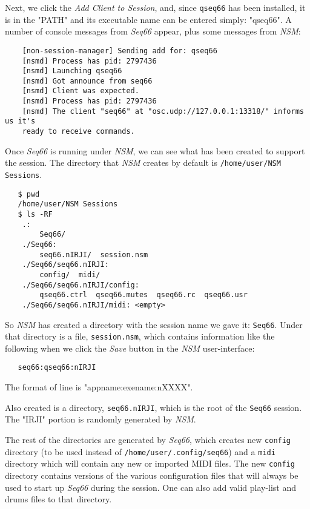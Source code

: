    Next, we click the \textsl{Add Client to Session}, and, since
   \texttt{qseq66} has been installed, it is in the "PATH" and its executable
   name can be entered simply: "qseq66".  A number of console messages from
   \textsl{Seq66} appear, plus some messages from \textsl{NSM}:

\begin{verbatim}
	[non-session-manager] Sending add for: qseq66
	[nsmd] Process has pid: 2797436
	[nsmd] Launching qseq66
	[nsmd] Got announce from seq66
	[nsmd] Client was expected.
	[nsmd] Process has pid: 2797436
	[nsmd] The client "seq66" at "osc.udp://127.0.0.1:13318/" informs us it's
    ready to receive commands.
\end{verbatim}

	Once \textsl{Seq66} is running under \textsl{NSM}, we can see what has
   been created to support the session.  The directory that \textsl{NSM}
   creates by default is \texttt{/home/user/NSM Sessions}.

\begin{verbatim}
   $ pwd
   /home/user/NSM Sessions
   $ ls -RF
	.:
		Seq66/
	./Seq66:
		seq66.nIRJI/  session.nsm
	./Seq66/seq66.nIRJI:
		config/  midi/
	./Seq66/seq66.nIRJI/config:
		qseq66.ctrl  qseq66.mutes  qseq66.rc  qseq66.usr
	./Seq66/seq66.nIRJI/midi: <empty>
\end{verbatim}

	So \textsl{NSM} has created a directory with the session name we gave it:
   \texttt{Seq66}.  Under that directory is a file, \texttt{session.nsm}, which
   contains information like the following when we click the \textsl{Save}
   button in the \textsl{NSM} user-interface:

\begin{verbatim}
   seq66:qseq66:nIRJI
\end{verbatim}

   The format of line is "appname:exename:nXXXX".

   Also created is a directory, \texttt{seq66.nIRJI}, which is the root of the
   \texttt{Seq66} session.  The "IRJI" portion is randomly generated by
   \textsl{NSM}.

   The rest of the directories are generated by \textsl{Seq66}, which creates
   new \texttt{config} directory (to be used instead of
   \texttt{/home/user/.config/seq66}) and a \texttt{midi} directory which will
   contain any new or imported MIDI files.  The new \texttt{config} directory
   contains versions of the various configuration files that will always be
   used to start up \textsl{Seq66} during the session.  One can also add valid
   play-list and drums files to that directory.

